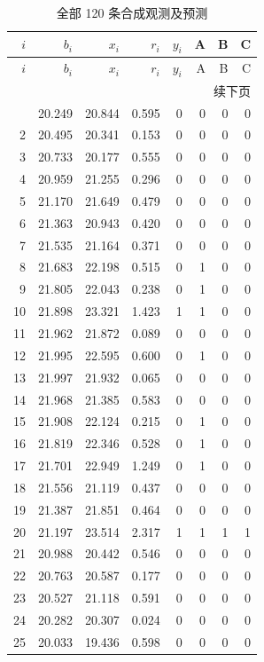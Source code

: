 \small
\begin{longtable}{rrrrrrrr}
\caption{全部 120 条合成观测及预测}\label{tab:full}\\
\toprule $i$ & $b_i$ & $x_i$ & $r_i$ & $y_i$ & A & B & C\\\midrule\endfirsthead
\toprule $i$ & $b_i$ & $x_i$ & $r_i$ & $y_i$ & A & B & C\\\midrule\endhead
\midrule\multicolumn{8}{r}{续下页}\\\endfoot
\bottomrule\endlastfoot
1 & 20.249 & 20.844 & 0.595 & 0 & 0 & 0 & 0\\
2 & 20.495 & 20.341 & 0.153 & 0 & 0 & 0 & 0\\
3 & 20.733 & 20.177 & 0.555 & 0 & 0 & 0 & 0\\
4 & 20.959 & 21.255 & 0.296 & 0 & 0 & 0 & 0\\
5 & 21.170 & 21.649 & 0.479 & 0 & 0 & 0 & 0\\
6 & 21.363 & 20.943 & 0.420 & 0 & 0 & 0 & 0\\
7 & 21.535 & 21.164 & 0.371 & 0 & 0 & 0 & 0\\
8 & 21.683 & 22.198 & 0.515 & 0 & 1 & 0 & 0\\
9 & 21.805 & 22.043 & 0.238 & 0 & 1 & 0 & 0\\
10 & 21.898 & 23.321 & 1.423 & 1 & 1 & 0 & 0\\
11 & 21.962 & 21.872 & 0.089 & 0 & 0 & 0 & 0\\
12 & 21.995 & 22.595 & 0.600 & 0 & 1 & 0 & 0\\
13 & 21.997 & 21.932 & 0.065 & 0 & 0 & 0 & 0\\
14 & 21.968 & 21.385 & 0.583 & 0 & 0 & 0 & 0\\
15 & 21.908 & 22.124 & 0.215 & 0 & 1 & 0 & 0\\
16 & 21.819 & 22.346 & 0.528 & 0 & 1 & 0 & 0\\
17 & 21.701 & 22.949 & 1.249 & 0 & 1 & 0 & 0\\
18 & 21.556 & 21.119 & 0.437 & 0 & 0 & 0 & 0\\
19 & 21.387 & 21.851 & 0.464 & 0 & 0 & 0 & 0\\
20 & 21.197 & 23.514 & 2.317 & 1 & 1 & 1 & 1\\
21 & 20.988 & 20.442 & 0.546 & 0 & 0 & 0 & 0\\
22 & 20.763 & 20.587 & 0.177 & 0 & 0 & 0 & 0\\
23 & 20.527 & 21.118 & 0.591 & 0 & 0 & 0 & 0\\
24 & 20.282 & 20.307 & 0.024 & 0 & 0 & 0 & 0\\
25 & 20.033 & 19.436 & 0.598 & 0 & 0 & 0 & 0\\

\end{longtable}
